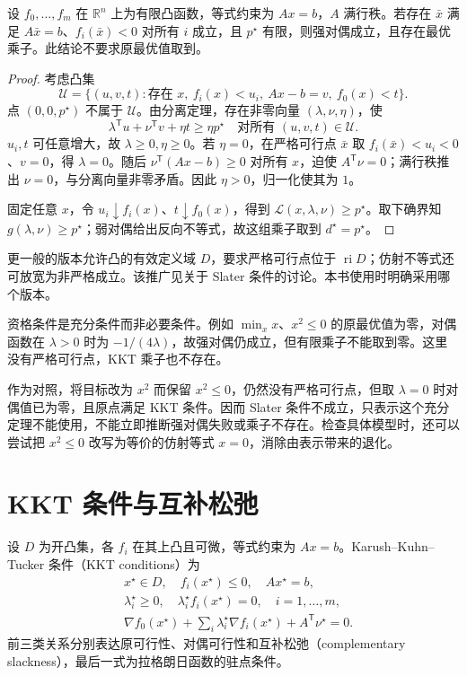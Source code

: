 \documentclass[UTF8,12pt,a4paper,fontset=fandol]{ctexbook}
\begin{document}
\begin{theorem}
设 $f_0,\ldots,f_m$ 在 $\mathbb R^n$ 上为有限凸函数，等式约束为 $Ax=b$，$A$ 满行秩。若存在 $\bar x$ 满足 $A\bar x=b$、$f_i(\bar x)<0$ 对所有 $i$ 成立，且 $p^\star$ 有限，则强对偶成立，且存在最优乘子。此结论不要求原最优值取到。
\label{thm:co-slater}
\end{theorem}
\begin{proof}
考虑凸集
\[
 \mathcal U=\{(u,v,t):\text{存在 }x,\ f_i(x)<u_i,\ Ax-b=v,\ f_0(x)<t\}.
\]
点 $(0,0,p^\star)$ 不属于 $\mathcal U$。由分离定理，存在非零向量 $(\lambda,\nu,\eta)$，使
\[
 \lambda^{\mathsf T}u+\nu^{\mathsf T}v+\eta t\geq\eta p^\star
 \quad\text{对所有 }(u,v,t)\in\mathcal U.
\]
$u_i,t$ 可任意增大，故 $\lambda\geq0,\eta\geq0$。若 $\eta=0$，在严格可行点 $\bar x$ 取 $f_i(\bar x)<u_i<0$、$v=0$，得 $\lambda=0$。随后 $\nu^{\mathsf T}(Ax-b)\geq0$ 对所有 $x$，迫使 $A^{\mathsf T}\nu=0$；满行秩推出 $\nu=0$，与分离向量非零矛盾。因此 $\eta>0$，归一化使其为 $1$。

固定任意 $x$，令 $u_i\downarrow f_i(x)$、$t\downarrow f_0(x)$，得到 $\mathcal L(x,\lambda,\nu)\geq p^\star$。取下确界知 $g(\lambda,\nu)\geq p^\star$；弱对偶给出反向不等式，故这组乘子取到 $d^\star=p^\star$。
\end{proof}

更一般的版本允许凸的有效定义域 $D$，要求严格可行点位于 $\operatorname{ri}D$；仿射不等式还可放宽为非严格成立。该推广见\cite{boyd-vandenberghe}关于 Slater 条件的讨论。本书使用时明确采用哪个版本。

资格条件是充分条件而非必要条件。例如 $\min_x x$、$x^2\leq0$ 的原最优值为零，对偶函数在 $\lambda>0$ 时为 $-1/(4\lambda)$，故强对偶仍成立，但有限乘子不能取到零。这里没有严格可行点，KKT 乘子也不存在。

作为对照，将目标改为 $x^2$ 而保留 $x^2\leq0$，仍然没有严格可行点，但取 $\lambda=0$ 时对偶值已为零，且原点满足 KKT 条件。因而 Slater 条件不成立，只表示这个充分定理不能使用，不能立即推断强对偶失败或乘子不存在。检查具体模型时，还可以尝试把 $x^2\leq0$ 改写为等价的仿射等式 $x=0$，消除由表示带来的退化。

\section{KKT 条件与互补松弛}

设 $D$ 为开凸集，各 $f_i$ 在其上凸且可微，等式约束为 $Ax=b$。Karush--Kuhn--Tucker 条件（KKT conditions）为
\begin{equation}
 \begin{aligned}
 &x^\star\in D,\quad f_i(x^\star)\leq0,\quad Ax^\star=b,\\
 &\lambda_i^\star\geq0,\quad\lambda_i^\star f_i(x^\star)=0,\quad i=1,\ldots,m,\\
 &\nabla f_0(x^\star)+\sum_i\lambda_i^\star\nabla f_i(x^\star)
    +A^{\mathsf T}\nu^\star=0.
 \end{aligned}
 \label{eq:co-kkt}
\end{equation}
前三类关系分别表达原可行性、对偶可行性和互补松弛（complementary slackness），最后一式为拉格朗日函数的驻点条件。
\end{document}
